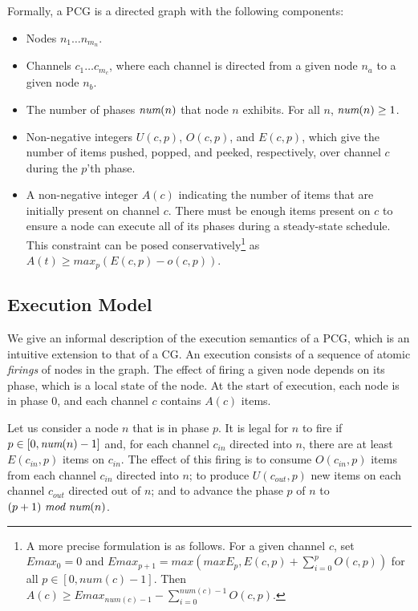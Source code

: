Formally, a PCG is a directed graph with the following components:
\begin{itemize}

\item Nodes $n_1 \dots n_{m_n}$.

\item Channels $c_1 \dots c_{m_c}$, where each channel is directed
from a given node $n_a$ to a given node $n_b$.

\item The number of phases $\mbox{\it num}(n)$ that node $n$ exhibits.  For
all $n$, $\mbox{\it num}(n) \ge 1$.

\item Non-negative integers $U(c, p)$, $O(c, p)$, and $E(c, p)$, which
give the number of items pushed, popped, and peeked, respectively,
over channel $c$ during the $p$'th phase.

\item A non-negative integer $A(c)$ indicating the number of items
  that are initially present on channel $c$.  There must be enough
  items present on $c$ to ensure a node can execute all of its phases
  during a steady-state schedule.  This constraint can be posed
  conservatively\footnote{A more precise formulation is as follows.
  For a given channel $c$, set $Emax_0 = 0$ and $Emax_{p+1} =
  max(maxE_p, E(c,p) + \sum_{i=0}^{p} O(c,p))$ for all $p \in [0,
  num(c) - 1]$.  Then $A(c) \ge Emax_{num(c)-1} -
  \sum_{i=0}^{num(c)-1} O(c,p)$.} as $A(t) \ge max_p (E(c,p) -
  o(c,p))$.

\end{itemize}

\subsection{Execution Model}

We give an informal description of the execution semantics of a PCG,
which is an intuitive extension to that of a CG.  An execution
consists of a sequence of atomic {\it firings} of nodes in the graph.
The effect of firing a given node depends on its phase, which is a
local state of the node.  At the start of execution, each node is in
phase 0, and each channel $c$ contains $A(c)$ items.

Let us consider a node $n$ that is in phase $p$.  It is legal for $n$
to fire if $p \in [0, \mbox{\it num}(n)-1]$ and, for each channel $c_{in}$
directed into $n$, there are at least $E(c_{in}, p)$ items on
$c_{in}$.  The effect of this firing is to consume $O(c_{in}, p)$
items from each channel $c_{in}$ directed into $n$; to produce
$U(c_{out}, p)$ new items on each channel $c_{out}$ directed out of
$n$; and to advance the phase $p$ of $n$ to $(p +
1)~\mbox{\it mod}~\mbox{\it num}(n)$.

